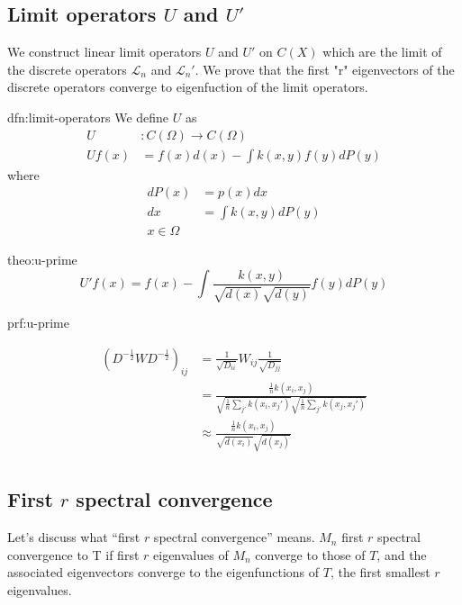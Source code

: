 \documentclass[12pt]{article}
\theoremstyle{plain}
\begin{document}
\subsection{Limit operators $U$ and $U'$}
We construct linear limit operators $U$ and $U'$ on $C(X)$ which are the limit of the discrete operators $\mathcal{L}_n$ and $\mathcal{L}_n'$. We prove that the first "r" eigenvectors of the discrete operators converge to eigenfuction  of the limit operators.
\begin{dfn}{dfn:limit-operators}
	We define $ U $ as
	\begin{align*}
	  U &: C(\Omega) \to C(\Omega) \\
	  Uf(x) &= f(x)d(x) - \int k(x, y) f(y) dP(y)
	\end{align*}
	where
	\begin{align*}
	  dP(x) &= p(x)dx \\
	  dx &= \int k(x, y) dP(y) \\
	  x \in \Omega
	\end{align*}
\end{dfn}
\begin{theo}[$ U' $]{theo:u-prime}
	\[
	U' f(x) = f(x) - \int{ \frac{ k(x, y) }{ \sqrt{ d(x) } \sqrt{ d(y) } } f(y) dP(y) }
	\]
\end{theo}

\begin{prf}{prf:u-prime}

  \begin{align*}
    (D^{-\frac{1}{2}} W D^{-\frac{1}{2}})_{ij} &= \frac{1}{\sqrt{D_{ii}}} W_{ij} \frac{1}{\sqrt{D_{jj}}} \\
    &= \frac{ \frac{1}{n} k(x_i, x_j) }{ \sqrt{ \frac{1}{n} \sum_{j'} k(x_i, x_j') } \sqrt{ \frac{1}{n} \sum_{j'} k(x_j, x_j') } } \\
    &\approx \frac{ \frac{1}{n} k(x_i, x_j) }{ \sqrt{d(x_i)} \sqrt{d(x_j)} } \\
  \end{align*}

\end{prf}

\subsection{First $ r $ spectral convergence}

Let's discuss what ``first $ r $ spectral convergence'' means.
$ M_n $ first $ r $ spectral convergence to T if first $ r $ eigenvalues of $ M_n $ converge to those of $ T $, and the associated eigenvectors converge to the eigenfunctions of $ T $, the first smallest $ r $ eigenvalues.
\end{document}
